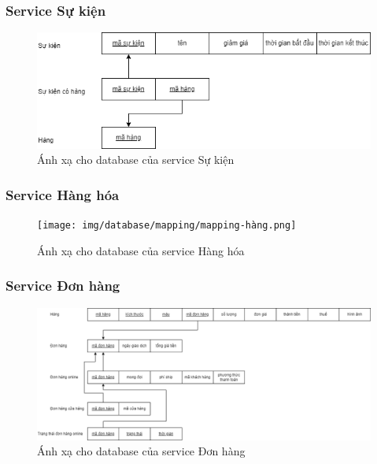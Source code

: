 \subsubsection{Service Sự kiện}
\begin{figure}[!htp]
    \begin{center}
        \includegraphics[width=1\textwidth]{img/database/mapping/mapping-event.png}
        \newline
        \caption{Ánh xạ cho database của service Sự kiện}
    \end{center}
\end{figure}

\subsubsection{Service Hàng hóa}
\begin{figure}[!htp]
    \begin{center}
        \texttt{[image: img/database/mapping/mapping-hàng.png]}
        \newline
        \caption{Ánh xạ cho database của service Hàng hóa}
    \end{center}
\end{figure}

\subsubsection{Service Đơn hàng}
\begin{figure}[!htp]
    \begin{center}
        \includegraphics[width=1\textwidth]{img/database/mapping/mapping-đơnhàng.png}
        \newline
        \caption{Ánh xạ cho database của service Đơn hàng}
    \end{center}
\end{figure}

